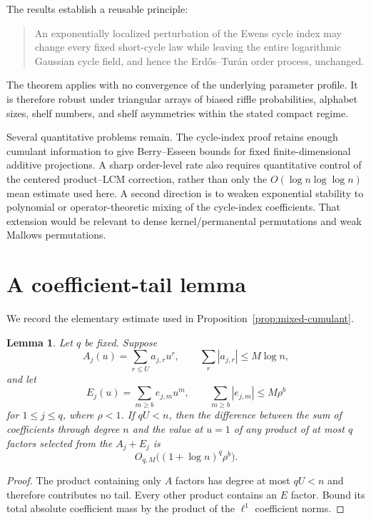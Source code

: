 \documentclass[11pt]{article}
\newtheorem{lemma}[theorem]{Lemma}
\theoremstyle{definition}
\theoremstyle{remark}
\begin{document}
The results establish a reusable principle:

\begin{quote}
An exponentially localized perturbation of the Ewens cycle index may
change every fixed short-cycle law while leaving the entire logarithmic
Gaussian cycle field, and hence the Erd\H{o}s--Tur\'an order process,
unchanged.
\end{quote}

The theorem applies with no convergence of the underlying parameter
profile.  It is therefore robust under triangular arrays of biased riffle
probabilities, alphabet sizes, shelf numbers, and shelf asymmetries within
the stated compact regime.

Several quantitative problems remain.  The cycle-index proof retains
enough cumulant information to give Berry--Esseen bounds for fixed
finite-dimensional additive projections.  A sharp order-level rate also
requires quantitative control of the centered product--LCM correction,
rather than only the $O(\log n\log\log n)$ mean estimate used here.
A second direction is to weaken exponential stability to polynomial or
operator-theoretic mixing of the cycle-index coefficients.  That extension
would be relevant to dense kernel/permanental permutations and weak
Mallows permutations.

\appendix

\section{A coefficient-tail lemma}

We record the elementary estimate used in
Proposition~\ref{prop:mixed-cumulant}.

\begin{lemma}\label{lem:coefficient-tail}
Let $q$ be fixed.  Suppose
\[
 A_j(u)=\sum_{r\le U}a_{j,r}u^r,
 \qquad
 \sum_r|a_{j,r}|\le M\log n,
\]
and let
\[
 E_j(u)=\sum_{m\ge b}e_{j,m}u^m,
 \qquad
 \sum_{m\ge b}|e_{j,m}|\le M\rho^b
\]
for $1\le j\le q$, where $\rho<1$.  If $qU<n$, then the difference between
the sum of coefficients through degree $n$ and the value at $u=1$ of any
product of at most $q$ factors selected from the $A_j+E_j$ is
\[
 O_{q,M}\bigl((1+\log n)^q\rho^b\bigr).
\]
\end{lemma}

\begin{proof}
The product containing only $A$ factors has degree at most $qU<n$ and
therefore contributes no tail.  Every other product contains an $E$
factor.  Bound its total absolute coefficient mass by the product of the
$\ell^1$ coefficient norms.
\end{proof}
\end{document}
